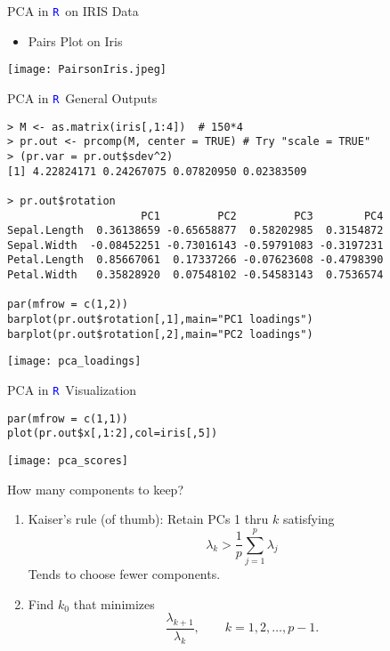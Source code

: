 \documentclass[notes=show]{beamer}
\newcommand \bit  {\begin{itemize}}
\newcommand \eit  {\end{itemize}}
\newcommand \ben  {\begin{enumerate}}
\newcommand \een  {\end{enumerate}}
\newcommand{\textR}[1]{\textcolor{blue}{\texttt{#1}}}
\newcommand{\R}{\textR{R}}
\begin{document}
\begin{frame}[fragile]{PCA in \R \, on IRIS Data}
\bit
\item Pairs Plot on Iris
\eit
\texttt{[image: PairsonIris.jpeg]}

\end{frame}




\begin{frame}[fragile]{PCA in \R \, General Outputs}

{\tiny
\begin{Verbatim}[formatcom=\color{blue}]
> M <- as.matrix(iris[,1:4])  # 150*4
> pr.out <- prcomp(M, center = TRUE) # Try "scale = TRUE"
> (pr.var = pr.out$sdev^2)
[1] 4.22824171 0.24267075 0.07820950 0.02383509

> pr.out$rotation
                     PC1         PC2         PC3        PC4
Sepal.Length  0.36138659 -0.65658877  0.58202985  0.3154872
Sepal.Width  -0.08452251 -0.73016143 -0.59791083 -0.3197231
Petal.Length  0.85667061  0.17337266 -0.07623608 -0.4798390
Petal.Width   0.35828920  0.07548102 -0.54583143  0.7536574

par(mfrow = c(1,2))
barplot(pr.out$rotation[,1],main="PC1 loadings")
barplot(pr.out$rotation[,2],main="PC2 loadings")
\end{Verbatim}
}

\texttt{[image: pca\_loadings]}
\end{frame}


\begin{frame}[fragile]{PCA in \R \, Visualization}

{\tiny
\begin{Verbatim}[formatcom=\color{blue}]
par(mfrow = c(1,1))
plot(pr.out$x[,1:2],col=iris[,5])
\end{Verbatim}
}

\texttt{[image: pca\_scores]}



\end{frame}






\begin{frame}{How many components to keep?}

\ben
\item Kaiser's rule (of thumb): Retain PCs 1 thru $k$ satisfying 
$$\lambda_k > \frac{1}{p} \sum_{j=1}^p \lambda_j $$ 
Tends to choose fewer components.
\item Find $k_0$ that minimizes 
$$ \frac{\lambda_{k+1}}{\lambda_k}, \quad \quad k = 1, 2, \ldots, p-1. $$ 
\een

\end{frame}
\end{document}
